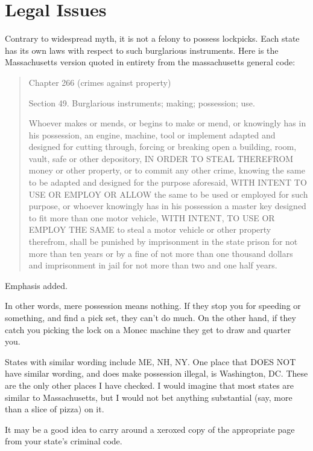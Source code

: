 \chapter{Legal Issues}
Contrary to widespread myth, it is not a felony to possess lockpicks. Each state has its own
laws with respect to such burglarious instruments. Here is the Massachusetts version quoted
in entirety from the massachusetts general code:

\begin{quote}
    \begin{center}
        Chapter 266 (crimes against property)

        Section 49. Burglarious instruments; making; possession; use.
    \end{center}


    Whoever makes or mends, or begins to make or mend, or knowingly has in
    his possession, an engine, machine, tool or implement adapted and designed for
    cutting through, forcing or breaking open a building, room, vault, safe or other
    depository, IN ORDER TO STEAL THEREFROM money or other property, or
    to commit any other crime, knowing the same to be adapted and designed for
    the purpose aforesaid, WITH INTENT TO USE OR EMPLOY OR ALLOW
    the same to be used or employed for such purpose, or whoever knowingly has in
    his possession a master key designed to fit more than one motor vehicle, WITH
    INTENT, TO USE OR EMPLOY THE SAME to steal a motor vehicle or other
    property therefrom, shall be punished by imprisonment in the state prison for
    not more than ten years or by a fine of not more than one thousand dollars and
    imprisonment in jail for not more than two and one half years.
\end{quote}

Emphasis added.

In other words, mere possession means nothing. If they stop you for speeding or something,
and find a pick set, they can't do much. On the other hand, if they catch you picking
the lock on a Monec machine they get to draw and quarter you.

States with similar wording include ME, NH, NY. One place that DOES NOT have
similar wording, and does make possession illegal, is Washington, DC. These are the only
other places I have checked. I would imagine that most states are similar to Massachusetts,
but I would not bet anything substantial (say, more than a slice of pizza) on it.

It may be a good idea to carry around a xeroxed copy of the appropriate page from your
state's criminal code.
